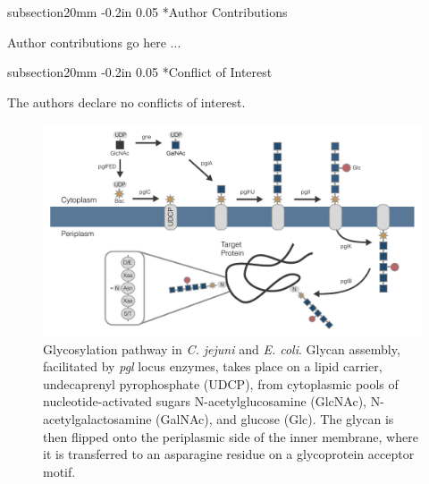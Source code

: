 \documentclass[12pt]{article}
\makeatletter
\renewcommand\section{\@startsection
	{subsection}{2}{0mm}
	{-0.2in}
	{0.05\baselineskip}
	{\normalfont\large\bfseries}}
\makeatother
\begin{document}
\section*{Author Contributions}

Author contributions go here ...

\section*{Conflict of Interest}

The authors declare no conflicts of interest. 

\newpage




\clearpage

\begin{figure}
\centering
\includegraphics[width=1.0\textwidth]{./figures/fig1_glyco_pathway.pdf}
\caption{Glycosylation pathway in \textit{C. jejuni} and \textit{E. coli}. 
Glycan assembly, facilitated by \textit{pgl} locus enzymes, takes place on a lipid carrier, undecaprenyl pyrophosphate (UDCP), from cytoplasmic pools of nucleotide-activated sugars N-acetylglucosamine (GlcNAc), N-acetylgalactosamine (GalNAc), and glucose (Glc). 
The glycan is then flipped onto the periplasmic side of the inner membrane, where it is transferred to an asparagine residue on a glycoprotein acceptor motif.}
\label{fig_pathway_cjejuni}
\end{figure}
\end{document}
